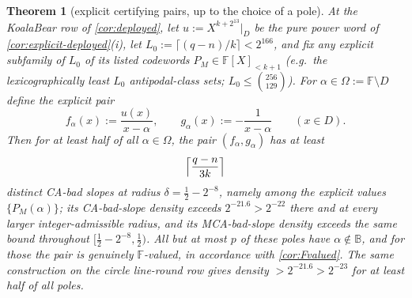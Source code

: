 \documentclass[11pt]{article}
\newtheorem{theorem}{Theorem}[section]
\theoremstyle{definition}
\theoremstyle{remark}
\newcommand{\F}{\mathbb{F}}
\newcommand{\B}{\mathbb{B}}
\begin{document}
\begin{theorem}[explicit certifying pairs, up to the choice of a pole]\label{thm:explicit-pairs}
At the KoalaBear row of \cref{cor:deployed}, let $u:=X^{k+2^{13}}|_D$ be the pure power word of \cref{cor:explicit-deployed}\textup{(i)}, let $L_0:=\lceil(q-n)/k\rceil<2^{166}$, and fix any explicit subfamily of $L_0$ of its listed codewords $P_M\in\F[X]_{<k+1}$ \textup(e.g.\ the lexicographically least $L_0$ antipodal-class sets; $L_0\le\binom{256}{129}$\textup). For $\alpha\in\Omega:=\F\setminus D$ define the explicit pair
\[
f_\alpha(x):=\frac{u(x)}{x-\alpha},
\qquad
g_\alpha(x):=-\frac1{x-\alpha}
\qquad(x\in D).
\]
Then for at least half of all $\alpha\in\Omega$, the pair $(f_\alpha,g_\alpha)$ has at least
\[
\Bigl\lceil\frac{q-n}{3k}\Bigr\rceil
\]
distinct CA-bad slopes at radius $\delta=\frac12-2^{-8}$, namely among the explicit values $\{P_M(\alpha)\}$; its CA-bad-slope density exceeds $2^{-21.6}>2^{-22}$ there and at every larger integer-admissible radius, and its MCA-bad-slope density exceeds the same bound throughout $[\frac12-2^{-8},\frac12)$. All but at most $p$ of these poles have $\alpha\notin\B$, and for those the pair is genuinely $\F$-valued, in accordance with \cref{cor:Fvalued}. The same construction on the circle line-round row gives density $>2^{-21.6}>2^{-23}$ for at least half of all poles.
\end{theorem}
\end{document}
